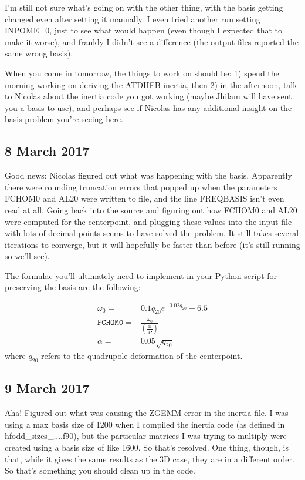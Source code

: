 \documentclass[]{report}
\begin{document}
I'm still not sure what's going on with the other thing, with the basis getting changed even after setting it manually. I even tried another run setting INPOME=0, just to see what would happen (even though I expected that to make it worse), and frankly I didn't see a difference (the output files reported the same wrong basis).

When you come in tomorrow, the things to work on should be: 1) spend the morning working on deriving the ATDHFB inertia, then 2) in the afternoon, talk to Nicolas about the inertia code you got working (maybe Jhilam will have sent you a basis to use), and perhaps see if Nicolas has any additional insight on the basis problem you're seeing here.

\subsection*{8 March 2017}
Good news: Nicolas figured out what was happening with the basis. Apparently there were rounding truncation errors that popped up when the parameters FCHOM0 and AL20 were written to file, and the line FREQBASIS isn't even read at all. Going back into the source and figuring out how FCHOM0 and AL20 were computed for the centerpoint, and plugging these values into the input file with lots of decimal points seems to have solved the problem. It still takes several iterations to converge, but it will hopefully be faster than before (it's still running so we'll see).

The formulae you'll ultimately need to implement in your Python script for preserving the basis are the following:

\begin{eqnarray}
\omega_0        =& 0.1q_{20}e^{-0.02q_{20}}+6.5 \\
\mathtt{FCHOM0} =& \frac{\omega_0}{\left(\frac{41}{A^\frac{1}{3}}\right)} \\
\alpha          =& 0.05\sqrt{q_{20}}
\end{eqnarray}
\noindent where $q_{20}$ refers to the quadrupole deformation of the centerpoint.

\subsection*{9 March 2017}
Aha! Figured out what was causing the ZGEMM error in the inertia file. I was using a max basis size of 1200 when I compiled the inertia code (as defined in hfodd\_sizes\_....f90), but the particular matrices I was trying to multiply were created using a basis size of like 1600. So that's resolved. One thing, though, is that, while it gives the same results as the 3D case, they are in a different order. So that's something you should clean up in the code. 
\end{document}
